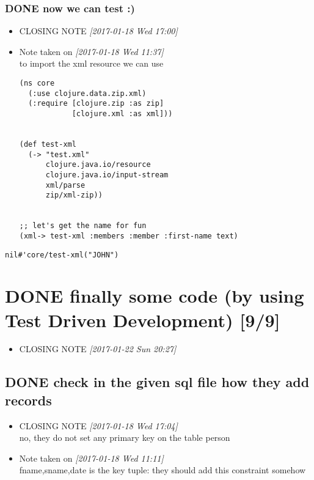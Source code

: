 \documentclass[11pt]{article}
\begin{document}
\subsubsection{{\bfseries\sffamily DONE} now we can test :)}
\label{sec:orge927dfc}
\begin{itemize}
\item CLOSING NOTE \textit{[2017-01-18 Wed 17:00]}
\item Note taken on \textit{[2017-01-18 Wed 11:37] } \\
to import the xml resource we can use

\begin{verbatim}
(ns core
  (:use clojure.data.zip.xml)
  (:require [clojure.zip :as zip]
            [clojure.xml :as xml]))


(def test-xml
  (-> "test.xml"
      clojure.java.io/resource
      clojure.java.io/input-stream
      xml/parse
      zip/xml-zip))


;; let's get the name for fun
(xml-> test-xml :members :member :first-name text)
\end{verbatim}
\end{itemize}

\begin{verbatim}
nil#'core/test-xml("JOHN")
\end{verbatim}

\section{{\bfseries\sffamily DONE} finally some code (by using Test Driven Development) [9/9]}
\label{sec:org64628ce}
\begin{itemize}
\item CLOSING NOTE \textit{[2017-01-22 Sun 20:27]}
\end{itemize}
\subsection{{\bfseries\sffamily DONE} check in the given sql file how they add records}
\label{sec:org4c0910c}
\begin{itemize}
\item CLOSING NOTE \textit{[2017-01-18 Wed 17:04] } \\
no, they do not set any primary key on the table person
\item Note taken on \textit{[2017-01-18 Wed 11:11] } \\
fname,sname,date is the key tuple: they should add this constraint somehow
\end{itemize}
\end{document}
